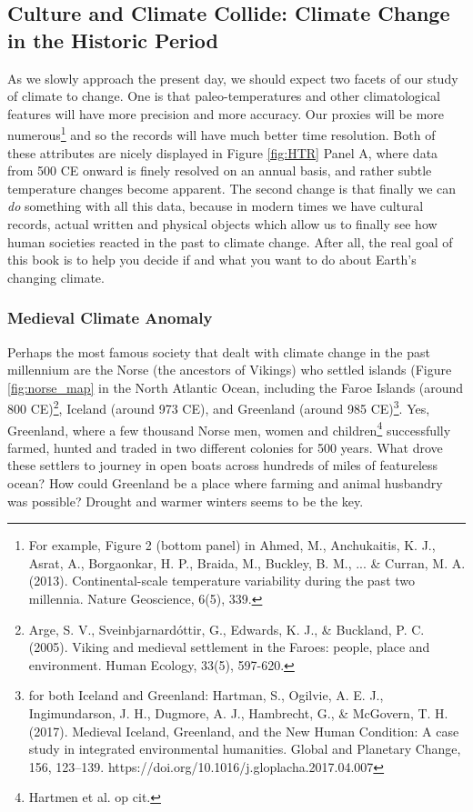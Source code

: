 \documentclass[amstex,12pt]{book}
\begin{document}
\subsection{Culture and Climate Collide: Climate Change in the Historic Period}
As we slowly approach the present day, we should expect two facets of our study of climate to change. One is that paleo-temperatures and other climatological features will have more precision and more accuracy. Our proxies will be more numerous\footnote{For example, Figure 2 (bottom panel) in Ahmed, M., Anchukaitis, K. J., Asrat, A., Borgaonkar, H. P., Braida, M., Buckley, B. M., ... \& Curran, M. A. (2013). Continental-scale temperature variability during the past two millennia. Nature Geoscience, 6(5), 339.} and so the records will have much better time resolution. Both of these attributes are nicely displayed in Figure \ref{fig:HTR} Panel A, where data from 500 CE onward is finely resolved on an annual basis, and rather subtle temperature changes become apparent. The second change is that finally we can \emph{do} something with all this data, because in modern times we have cultural records, actual written and physical objects which allow us to finally see how human societies reacted in the past to climate change. After all, the real goal of this book is to help you decide if and what you want to do about Earth's changing climate.

\subsubsection{Medieval Climate Anomaly}
Perhaps the most famous society that dealt with climate change in the past millennium are the Norse (the ancestors of Vikings) who settled islands (Figure \ref{fig:norse_map} in the North Atlantic Ocean, including the Faroe Islands (around 800 CE)\footnote{Arge, S. V., Sveinbjarnardóttir, G., Edwards, K. J., \& Buckland, P. C. (2005). Viking and medieval settlement in the Faroes: people, place and environment. Human Ecology, 33(5), 597-620.}, Iceland (around 973 CE), and Greenland (around 985 CE)\footnote{for both Iceland and Greenland: Hartman, S., Ogilvie, A. E. J., Ingimundarson, J. H., Dugmore, A. J., Hambrecht, G., \& McGovern, T. H. (2017). Medieval Iceland, Greenland, and the New Human Condition: A case study in integrated environmental humanities. Global and Planetary Change, 156, 123–139. https://doi.org/10.1016/j.gloplacha.2017.04.007
}. Yes, Greenland, where a few thousand Norse men, women and children\footnote{Hartmen et al. op cit.} successfully farmed, hunted and traded in two different colonies for 500 years. What drove these settlers to journey in open boats across hundreds of miles of featureless ocean? How could Greenland be a place where farming and animal husbandry was possible? Drought and warmer winters seems to be the key.\\
\end{document}
